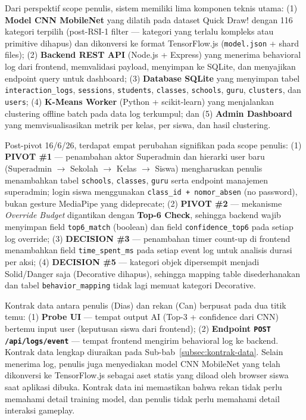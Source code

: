 \documentclass[12pt,a4paper,oneside,openany]{report}
\begin{document}
Dari perspektif scope penulis, sistem memiliki lima komponen teknis utama: (1) \textbf{Model CNN MobileNet} yang dilatih pada dataset Quick Draw! dengan 116 kategori terpilih (post-RSI-1 filter --- kategori yang terlalu kompleks atau primitive dihapus) dan dikonversi ke format TensorFlow.js (\texttt{model.json} + shard files); (2) \textbf{Backend REST API} (Node.js + Express) yang menerima behavioral log dari frontend, memvalidasi payload, menyimpan ke SQLite, dan menyajikan endpoint query untuk dashboard; (3) \textbf{Database SQLite} yang menyimpan tabel \texttt{interaction\_logs}, \texttt{sessions}, \texttt{students}, \texttt{classes}, \texttt{schools}, \texttt{guru}, \texttt{clusters}, dan \texttt{users}; (4) \textbf{K-Means Worker} (Python + scikit-learn) yang menjalankan clustering offline batch pada data log terkumpul; dan (5) \textbf{Admin Dashboard} yang memvisualisasikan metrik per kelas, per siswa, dan hasil clustering.

Post-pivot 16/6/26, terdapat empat perubahan signifikan pada scope penulis: (1) \textbf{PIVOT \#1} --- penambahan aktor Superadmin dan hierarki user baru (Superadmin $\rightarrow$ Sekolah $\rightarrow$ Kelas $\rightarrow$ Siswa) mengharuskan penulis menambahkan tabel \texttt{schools}, \texttt{classes}, \texttt{guru} serta endpoint manajemen superadmin; login siswa menggunakan \texttt{class\_id + nomor\_absen} (no password), bukan gesture MediaPipe yang dideprecate; (2) \textbf{PIVOT \#2} --- mekanisme \textit{Override Budget} digantikan dengan \textbf{Top-6 Check}, sehingga backend wajib menyimpan field \texttt{top6\_match} (boolean) dan field \texttt{confidence\_top6} pada setiap log override; (3) \textbf{DECISION \#3} --- penambahan timer count-up di frontend menambahkan field \texttt{time\_spent\_ms} pada setiap event log untuk analisis durasi per aksi; (4) \textbf{DECISION \#5} --- kategori objek dipersempit menjadi Solid/Danger saja (Decorative dihapus), sehingga mapping table disederhanakan dan tabel \texttt{behavior\_mapping} tidak lagi memuat kategori Decorative.

Kontrak data antara penulis (Dias) dan rekan (Can) berpusat pada dua titik temu: (1) \textbf{Probe UI} --- tempat output AI (Top-3 + confidence dari CNN) bertemu input user (keputusan siswa dari frontend); (2) \textbf{Endpoint \texttt{POST /api/logs/event}} --- tempat frontend mengirim behavioral log ke backend. Kontrak data lengkap diuraikan pada Sub-bab~\ref{subsec:kontrak-data}. Selain menerima log, penulis juga menyediakan model CNN MobileNet yang telah dikonversi ke TensorFlow.js sebagai aset statis yang diload oleh browser siswa saat aplikasi dibuka. Kontrak data ini memastikan bahwa rekan tidak perlu memahami detail training model, dan penulis tidak perlu memahami detail interaksi gameplay.
\end{document}
